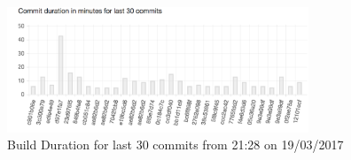\begin{figure}[H]
\begin{center}
\includegraphics[width=9cm]{figures/cicd_build_duration}
\end{center}
\caption{Build Duration for last 30 commits from 21:28 on 19/03/2017}
\label{fig:cicd_build_duration}
\end{figure}
